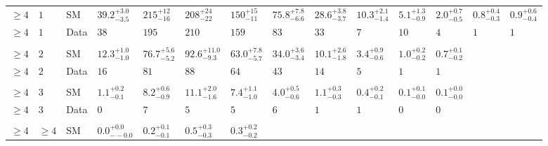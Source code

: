 \begin{landscape}
\begin{center}
\begin{table}[h!]
\begin{tabular}{ llllllllllllll }
    $\geq 4$             & $1$      & SM   & $39.2^{+3.0}_{-3.5}$           & $215^{+12}_{-16}$              & $208^{+24}_{-22}$              & $150^{+15}_{-11}$              & $75.8^{+7.8}_{-6.6}$           & $28.6^{+3.8}_{-3.7}$           & $10.3^{+2.1}_{-1.4}$           & $5.1^{+1.3}_{-0.9}$            & $2.0^{+0.7}_{-0.5}$            & $0.8^{+0.4}_{-0.3}$            & $0.9^{+0.6}_{-0.4}$ \\ 
    $\geq 4$             & $1$      & Data & $38$                           & $195$                          & $210$                          & $159$                          & $83$                           & $33$                           & $7$                            & $10$                           & $4$                            & $1$                            & $1$                 \\\\
    $\geq 4$             & $2$      & SM   & $12.3^{+1.0}_{-1.0}$           & $76.7^{+5.6}_{-5.2}$           & $92.6^{+11.0}_{-9.3}$          & $63.0^{+7.8}_{-5.7}$           & $34.0^{+3.6}_{-3.4}$           & $10.1^{+2.6}_{-1.8}$           & $3.4^{+0.9}_{-0.6}$            & $1.0^{+0.2}_{-0.2}$            & $0.7^{+0.1}_{-0.2}$                      \\ 
    $\geq 4$             & $2$      & Data & $16$                           & $81$                           & $88$                           & $64$                           & $43$                           & $14$                           & $5$                            & $1$                            & $1$                      \\\\ 
    $\geq 4$             & $3$      & SM   & $1.1^{+0.2}_{-0.1}$            & $8.2^{+0.6}_{-0.9}$            & $11.1^{+2.0}_{-1.6}$           & $7.4^{+1.1}_{-1.0}$            & $4.0^{+0.5}_{-0.6}$            & $1.1^{+0.3}_{-0.3}$            & $0.4^{+0.2}_{-0.1}$            & $0.1^{+0.1}_{-0.0}$            & $0.1^{+0.0}_{-0.0}$                     \\ 
    $\geq 4$             & $3$      & Data & $0$                            & $7$                            & $5$                            & $5$                            & $6$                            & $1$                            & $1$                            & $0$                            & $0$                      \\\\ 
    $\geq 4$             & $\geq 4$ & SM   & $0.0^{+0.0}_{--0.0}$           & $0.2^{+0.1}_{-0.1}$            & $0.5^{+0.3}_{-0.3}$            & $0.3^{+0.2}_{-0.2}$  & \multicolumn{7}{l}{}                                                                                                                                          \\ 

\end{tabular}
\end{table}
\end{center}
\end{landscape}
